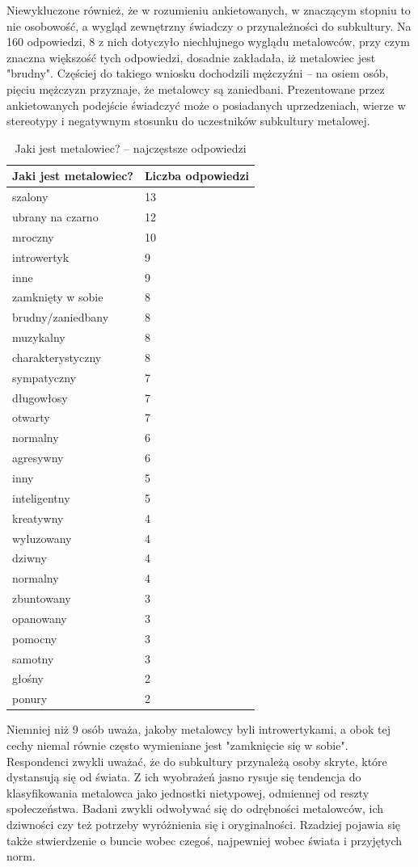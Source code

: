 \documentclass[12pt, a4paper, titlepage]{report}
\begin{document}
Niewykluczone również, że w rozumieniu ankietowanych, w znaczącym stopniu to nie osobowość, a wygląd zewnętrzny świadczy o przynależności do subkultury. Na 160 odpowiedzi, 8 z nich dotyczyło niechlujnego wyglądu metalowców, przy czym znaczna większość tych odpowiedzi, dosadnie zakładała, iż metalowiec jest "brudny". Częściej do takiego wniosku dochodzili mężczyźni -- na osiem osób, pięciu mężczyzn przyznaje, że metalowcy są zaniedbani. Prezentowane przez ankietowanych podejście świadczyć może o posiadanych uprzedzeniach, wierze w stereotypy i negatywnym stosunku do uczestników subkultury metalowej. 


\begin{table}
\begin{tabular}{ m{23em} | m{5em} } 
\textbf{Jaki jest metalowiec?
} & Liczba odpowiedzi \\
\hline
szalony	& 13 \\
ubrany na czarno & 12 \\
mroczny	& 10\\
introwertyk & 9\\
inne & 9\\
zamknięty w sobie & 8\\
brudny/zaniedbany &	8\\
muzykalny & 8\\
charakterystyczny & 8\\
sympatyczny	& 7\\
długowłosy	& 7\\
otwarty	& 7\\
normalny & 6\\
agresywny & 6\\
inny & 5\\
inteligentny & 5\\
kreatywny & 4\\
wyluzowany & 4\\
dziwny	& 4\\
normalny & 4\\
zbuntowany & 3\\
opanowany & 3\\
pomocny	& 3\\
samotny	& 3\\
głośny & 2\\
ponury & 2\\
\end{tabular} 
\caption{Jaki jest metalowiec? -- najczęstsze odpowiedzi}
\label{table:1}
\end{table}


Niemniej niż 9 osób uważa, jakoby metalowcy byli introwertykami, a obok tej cechy niemal równie często wymieniane jest "zamknięcie się w sobie".  Respondenci zwykli uważać, że do subkultury przynależą osoby skryte, które dystansują się od świata. Z ich wyobrażeń jasno rysuje się tendencja do klasyfikowania metalowca jako jednostki  nietypowej, odmiennej od reszty społeczeństwa. Badani zwykli odwoływać się do odrębności metalowców, ich dziwności czy też potrzeby wyróżnienia się i oryginalności. Rzadziej pojawia się także stwierdzenie o buncie wobec czegoś, najpewniej wobec świata i przyjętych norm. 
\end{document}

